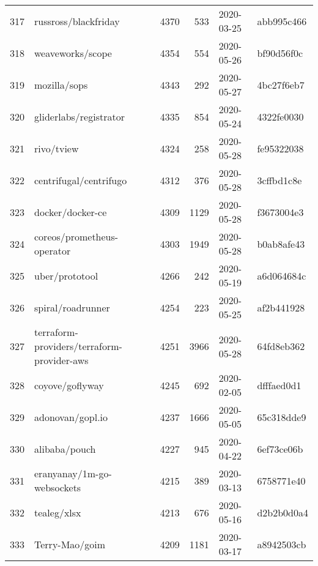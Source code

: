 \begin{footnotesize}
\begin{longtable}{llrrll}
        317 &                               russross/blackfriday &   4370 &    533 & 2020-03-25 &  abb995c466 \\
        318 &                                   weaveworks/scope &   4354 &    554 & 2020-05-26 &  bf90d56f0c \\
        319 &                                       mozilla/sops &   4343 &    292 & 2020-05-27 &  4bc27f6eb7 \\
        320 &                             gliderlabs/registrator &   4335 &    854 & 2020-05-24 &  4322fe0030 \\
        321 &                                         rivo/tview &   4324 &    258 & 2020-05-28 &  fe95322038 \\
        322 &                             centrifugal/centrifugo &   4312 &    376 & 2020-05-28 &  3cffbd1c8e \\
        323 &                                   docker/docker-ce &   4309 &   1129 & 2020-05-28 &  f3673004e3 \\
        324 &                         coreos/prometheus-operator &   4303 &   1949 & 2020-05-28 &  b0ab8afe43 \\
        325 &                                     uber/prototool &   4266 &    242 & 2020-05-19 &  a6d064684c \\
        326 &                                  spiral/roadrunner &   4254 &    223 & 2020-05-25 &  af2b441928 \\
        327 &         terraform-providers/terraform-provider-aws &   4251 &   3966 & 2020-05-28 &  64fd8eb362 \\
        328 &                                    coyove/goflyway &   4245 &    692 & 2020-02-05 &  dfffaed0d1 \\
        329 &                                   adonovan/gopl.io &   4237 &   1666 & 2020-05-05 &  65c318dde9 \\
        330 &                                      alibaba/pouch &   4227 &    945 & 2020-04-22 &  6ef73ce06b \\
        331 &                         eranyanay/1m-go-websockets &   4215 &    389 & 2020-03-13 &  6758771e40 \\
        332 &                                        tealeg/xlsx &   4213 &    676 & 2020-05-16 &  d2b2b0d0a4 \\
        333 &                                     Terry-Mao/goim &   4209 &   1181 & 2020-03-17 &  a8942503cb \\

\end{longtable}
\end{footnotesize}
